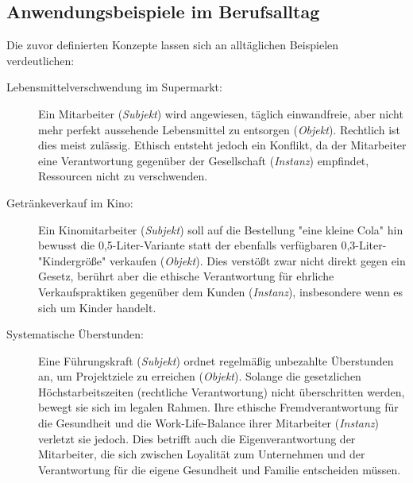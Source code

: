 \documentclass[
    12pt,               %
    a4paper,            %
    ngerman             %
]{scrartcl}
\begin{document}
\subsection{Anwendungsbeispiele im Berufsalltag}
Die zuvor definierten Konzepte lassen sich an alltäglichen Beispielen verdeutlichen:

\begin{description}
    \item[Lebensmittelverschwendung im Supermarkt:] Ein Mitarbeiter (\textit{Subjekt}) wird angewiesen, täglich einwandfreie, aber nicht mehr perfekt aussehende Lebensmittel zu entsorgen (\textit{Objekt}). Rechtlich ist dies meist zulässig. Ethisch entsteht jedoch ein Konflikt, da der Mitarbeiter eine Verantwortung gegenüber der Gesellschaft (\textit{Instanz}) empfindet, Ressourcen nicht zu verschwenden.
    \item[Getränkeverkauf im Kino:] Ein Kinomitarbeiter (\textit{Subjekt}) soll auf die Bestellung "eine kleine Cola" hin bewusst die 0,5-Liter-Variante statt der ebenfalls verfügbaren 0,3-Liter-"Kindergröße" verkaufen (\textit{Objekt}). Dies verstößt zwar nicht direkt gegen ein Gesetz, berührt aber die ethische Verantwortung für ehrliche Verkaufspraktiken gegenüber dem Kunden (\textit{Instanz}), insbesondere wenn es sich um Kinder handelt.
    \item[Systematische Überstunden:] Eine Führungskraft (\textit{Subjekt}) ordnet regelmäßig unbezahlte Überstunden an, um Projektziele zu erreichen (\textit{Objekt}). Solange die gesetzlichen Höchstarbeitszeiten (rechtliche Verantwortung) nicht überschritten werden, bewegt sie sich im legalen Rahmen. Ihre ethische Fremdverantwortung für die Gesundheit und die Work-Life-Balance ihrer Mitarbeiter (\textit{Instanz}) verletzt sie jedoch. Dies betrifft auch die Eigenverantwortung der Mitarbeiter, die sich zwischen Loyalität zum Unternehmen und der Verantwortung für die eigene Gesundheit und Familie entscheiden müssen.
\end{description}


\end{document}
